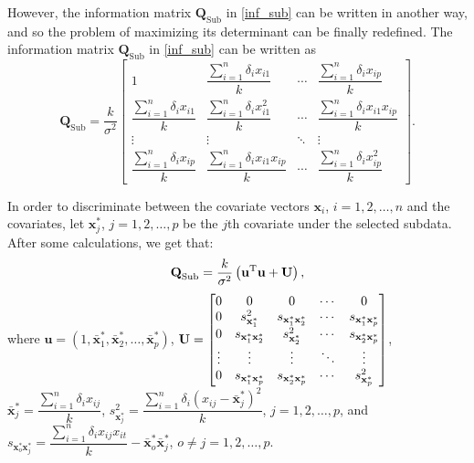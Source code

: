 \documentclass[12pt]{article}
\theoremstyle{definition}
\begin{document}
	However, the information matrix $\textbf{Q}_{\text{Sub}}$ in \eqref{inf_sub} can be written in another way, and so the problem of maximizing its determinant can be finally redefined. The information matrix $\textbf{Q}_{\text{Sub}}$ in \eqref{inf_sub} can be written as
	\begin{equation*}
		\textbf{Q}_{\text{Sub}}=\dfrac{k}{\sigma^2}\begin{bmatrix}
			1 & \dfrac{\sum_{i=1}^{n}\delta_ix_{i1}}{k} & \cdots & \dfrac{\sum_{i=1}^{n}\delta_ix_{ip}}{k}\\ 
			\dfrac{\sum_{i=1}^{n}\delta_ix_{i1}}{k} & \dfrac{\sum_{i=1}^{n}\delta_ix_{i1}^2}{k} & \cdots & \dfrac{\sum_{i=1}^{n}\delta_ix_{i1}x_{ip}}{k} \\
			\vdots & \vdots & \ddots & \vdots \\
			\dfrac{\sum_{i=1}^{n}\delta_ix_{ip}}{k} & \dfrac{\sum_{i=1}^{n}\delta_ix_{i1}x_{ip}}{k} & \cdots & \dfrac{\sum_{i=1}^{n}\delta_ix_{ip}^2}{k}
		\end{bmatrix}.
	\end{equation*}
	
	In order to discriminate between the covariate vectors $\textbf{x}_i$, $i=1,2,\ldots,n$ and the covariates, let $\textbf{x}_j^*$, $j=1,2,\ldots,p$ be the $j$th covariate under the selected subdata. After some calculations, we get that:
	\begin{equation*}
		\textbf{Q}_{\text{Sub}}=\dfrac{k}{\sigma^2}\left(\textbf{u}^{\text{T}}\textbf{u}+\textbf{\text{U}}\right), 
	\end{equation*}
	where $\textbf{u}=(1,\bar{\textbf{x}}_1^*,\bar{\textbf{x}}_2^*,\ldots, \bar{\textbf{x}}_p^*)$, $\textbf{\text{U}}=\begin{bmatrix}
		0 & 0 & 0 & \cdots & 0 \\
		0 & s_{\textbf{x}_1^*}^2 & s_{\textbf{x}_1^*\textbf{x}_2^*} & \cdots & s_{\textbf{x}_1^*\textbf{x}_p^*}\\
		0 & s_{\textbf{x}_1^*\textbf{x}_2^*} & s_{\textbf{x}_2^*}^2 & \cdots & s_{\textbf{x}_2^*\textbf{x}_p^*}\\
		\vdots &	\vdots & \vdots & \ddots & \vdots \\
		0 &	 s_{\textbf{x}_1^*\textbf{x}_p^*} & s_{\textbf{x}_2^*\textbf{x}_p^*} & \cdots & s_{\textbf{x}_p^*}^2
	\end{bmatrix}$, $\bar{\textbf{x}}_j^*=\dfrac{\sum_{i=1}^{n}\delta_ix_{ij}}{k}$, $s_{\textbf{x}_j^*}^2=\dfrac{\sum_{i=1}^{n}\delta_i(x_{ij}-\bar{\textbf{x}}_j^*)^2}{k}$, $j=1,2,\ldots,p$, and $s_{\textbf{x}_o^*\textbf{x}_j^*}=\dfrac{\sum_{i=1}^{n}\delta_ix_{ij}x_{it}}{k}-\bar{\textbf{x}}_o^*\bar{\textbf{x}}_j^*$, $o\ne j=1,2,\ldots,p$.\\
	
\end{document}
